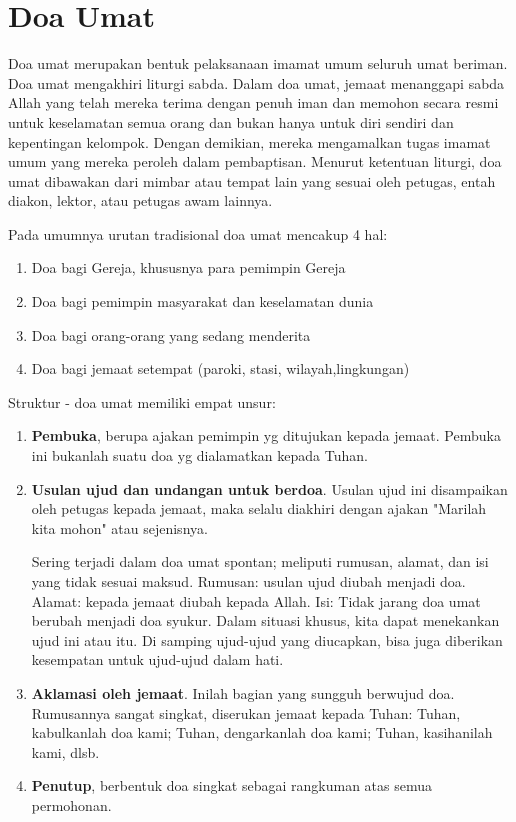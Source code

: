 \section{Doa Umat}
Doa umat merupakan bentuk pelaksanaan imamat umum seluruh umat beriman. Doa umat mengakhiri liturgi sabda. Dalam doa umat, jemaat menanggapi sabda Allah yang telah mereka terima dengan penuh iman dan memohon secara resmi untuk keselamatan semua orang dan bukan hanya untuk diri sendiri dan kepentingan kelompok. Dengan demikian, mereka mengamalkan tugas imamat umum yang mereka peroleh dalam pembaptisan. Menurut ketentuan liturgi, doa umat dibawakan dari mimbar atau tempat lain yang sesuai oleh petugas, entah diakon, lektor, atau petugas awam lainnya. 
 
Pada umumnya urutan tradisional doa umat mencakup 4 hal:
\begin{enumerate}
\item  Doa bagi Gereja, khususnya para pemimpin Gereja
\item Doa bagi pemimpin masyarakat dan keselamatan dunia
\item Doa bagi orang-orang yang sedang menderita
\item Doa bagi jemaat setempat (paroki, stasi, wilayah,lingkungan)
\end{enumerate} 
 
Struktur - doa umat memiliki empat unsur:
\begin{enumerate}
\item \textbf{Pembuka}, berupa ajakan pemimpin yg ditujukan kepada jemaat. Pembuka ini bukanlah suatu doa yg dialamatkan kepada Tuhan.
\item \textbf{Usulan ujud dan undangan untuk berdoa}.
Usulan ujud ini disampaikan oleh petugas kepada jemaat, maka selalu diakhiri dengan ajakan "Marilah kita mohon" atau sejenisnya.

Sering terjadi dalam doa umat spontan; meliputi rumusan, alamat, dan isi yang tidak sesuai maksud. Rumusan: usulan ujud diubah menjadi doa. Alamat: kepada jemaat diubah kepada Allah. Isi: Tidak jarang doa umat berubah menjadi doa syukur.
Dalam situasi khusus, kita dapat menekankan ujud ini atau itu. Di samping ujud-ujud yang diucapkan, bisa juga diberikan kesempatan untuk ujud-ujud dalam hati.

\item \textbf{Aklamasi oleh jemaat}.
Inilah bagian yang sungguh berwujud doa. Rumusannya sangat singkat, diserukan jemaat kepada Tuhan: Tuhan, kabulkanlah doa kami; Tuhan, dengarkanlah doa kami; Tuhan, kasihanilah kami, dlsb.
\item \textbf{Penutup}, berbentuk doa singkat sebagai rangkuman atas semua permohonan.
\end{enumerate}

